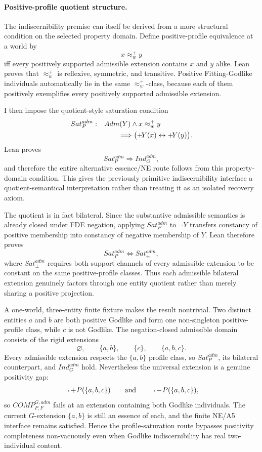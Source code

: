 \paragraph{Positive-profile quotient structure.}
The indiscernibility premise can itself be derived from a more structural condition on the selected property domain. Define positive-profile equivalence at a world by
\[
  x\approx_w^+ y
\]
iff every positively supported admissible extension contains \(x\) and \(y\) alike. Lean proves that \(\approx_w^+\) is reflexive, symmetric, and transitive. Positive Fitting-Godlike individuals automatically lie in the same \(\approx_w^+\)-class, because each of them positively exemplifies every positively supported admissible extension.

I then impose the quotient-style saturation condition
\[
\begin{split}
  Sat_P^{adm}:\quad
  &Adm(Y)\land x\approx_w^+y\\
  &\qquad\Longrightarrow
  \bigl(+\!Y(x)\leftrightarrow+\!Y(y)\bigr).
\end{split}
\]
Lean proves
\[
  Sat_P^{adm}\Longrightarrow Ind_G^{adm},
\]
and therefore the entire alternative essence/NE route follows from this property-domain condition. This gives the previously primitive indiscernibility interface a quotient-semantical interpretation rather than treating it as an isolated recovery axiom.

The quotient is in fact bilateral. Since the substantive admissible semantics is already closed under FDE negation, applying \(Sat_P^{adm}\) to \(\neg Y\) transfers constancy of positive membership into constancy of negative membership of \(Y\). Lean therefore proves
\[
\boxed{
  Sat_P^{adm}\Longleftrightarrow Sat_{\pm}^{adm},
}
\]
where \(Sat_{\pm}^{adm}\) requires both support channels of every admissible extension to be constant on the same positive-profile classes. Thus each admissible bilateral extension genuinely factors through one entity quotient rather than merely sharing a positive projection.

A one-world, three-entity finite fixture makes the result nontrivial. Two distinct entities \(a\) and \(b\) are both positive Godlike and form one non-singleton positive-profile class, while \(c\) is not Godlike. The negation-closed admissible domain consists of the rigid extensions
\[
  \varnothing,\qquad \{a,b\},\qquad \{c\},\qquad \{a,b,c\}.
\]
Every admissible extension respects the \(\{a,b\}\) profile class, so \(Sat_P^{adm}\), its bilateral counterpart, and \(Ind_G^{adm}\) hold. Nevertheless the universal extension is a genuine positivity gap:
\[
  \neg+\!P(\{a,b,c\})
  \qquad\text{and}\qquad
  \neg-\!P(\{a,b,c\}),
\]
so \(COMP_{P,F}^{G,adm}\) fails at an extension containing both Godlike individuals. The current \(G\)-extension \(\{a,b\}\) is still an essence of each, and the finite NE/A5 interface remains satisfied. Hence the profile-saturation route bypasses positivity completeness non-vacuously even when Godlike indiscernibility has real two-individual content.

